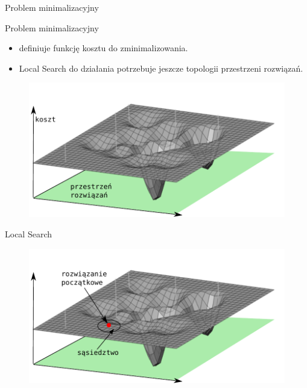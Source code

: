 \documentclass[blue]{beamer}
\begin{document}
\begin{frame}{Problem minimalizacyjny}
\begin{block}{Problem minimalizacyjny}
\begin{itemize}
\item definiuje funkcję kosztu do zminimalizowania.
\item Local Search do działania potrzebuje jeszcze topologii przestrzeni rozwiązań.
\end{itemize}
\end{block}
\begin{figure}
\includegraphics[scale=.7]{ss1.pdf}
\end{figure}
\end{frame}

\begin{frame}{Local Search}
\begin{figure}
\includegraphics[scale=.7]{ss2.pdf}
\end{figure}
\end{frame}
\end{document}
